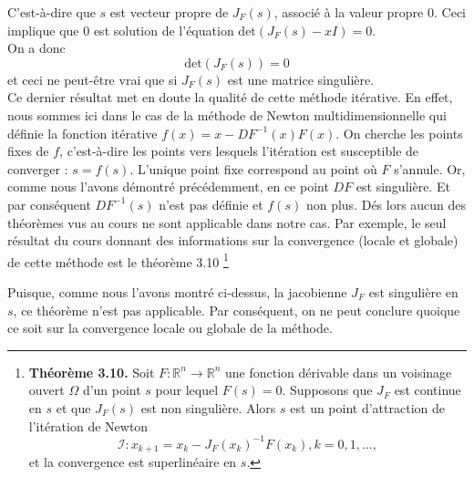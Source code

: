 C'est-à-dire que $s$ est vecteur propre de $J_F(s)$, associé à la valeur propre $0$. Ceci implique que $0$ est solution de l'équation $\text{det}(J_F(s)-xI)=0$.\\
On a donc $$\text{det}(J_F(s))=0$$ et ceci ne peut-être vrai que si $J_F(s)$ est une matrice singulière.\\

Ce dernier résultat met en doute la qualité de cette méthode itérative. En effet, nous sommes ici dans le cas de la méthode de Newton multidimensionnelle qui définie la fonction itérative $f(x)=x-DF^{-1}(x) F(x)$. On cherche les points fixes de $f$, c'est-à-dire les points vers lesquels l'itération est susceptible de converger : $s=f(s)$. L'unique point fixe correspond au point où $F$ s'annule. Or, comme nous l'avons démontré précédemment, en ce point $DF$ est singulière. Et par conséquent $DF^{-1}(s)$ n'est pas définie et $f(s)$ non plus. Dés lors aucun des théorèmes vus au cours ne sont applicable dans notre cas. Par exemple, le seul résultat du cours donnant des informations sur la convergence (locale et globale) de cette méthode est le théorème 3.10 \footnote{
\textbf{Théorème 3.10.} Soit $F : \mathbb{R}^n \rightarrow \mathbb{R}^n$ une fonction dérivable dans un voisinage ouvert $\Omega$ d'un point $s$ pour lequel $F(s)=0$. Supposons que $J_F$ est continue en $s$ et que $J_F(s)$ est non singulière. Alors $s$ est un point d'attraction de l'itération de Newton $$\mathcal{I} : x_{k+1} = x_k - J_F(x_k)^{-1}F(x_k), k = 0,1,...,$$ et la convergence est superlinéaire en $s$.}

Puisque, comme nous l'avons montré ci-dessus, la jacobienne $J_F$ est singulière en $s$, ce théorème n'est pas applicable. Par conséquent, on ne peut conclure quoique ce soit sur la convergence locale ou globale de la méthode.\\


